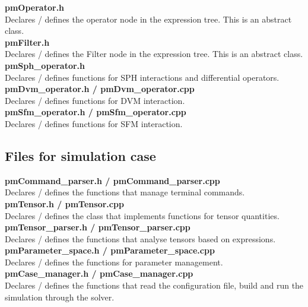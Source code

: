 \documentclass[a4paper,12pt,openany]{book}
\theoremstyle{break}
\begin{document}
\textbf{pmOperator.h} \\
Declares / defines the operator node in the expression tree. This is an abstract class. \\

\textbf{pmFilter.h} \\
Declares / defines the Filter node in the expression tree. This is an abstract class. \\

\textbf{pmSph\_operator.h} \\
Declares / defines functions for SPH interactions and differential operators. \\

\textbf{pmDvm\_operator.h / pmDvm\_operator.cpp} \\
Declares / defines functions for DVM interaction. \\

\textbf{pmSfm\_operator.h / pmSfm\_operator.cpp} \\
Declares / defines functions for SFM interaction. \\

\subsection{Files for simulation case}

\textbf{pmCommand\_parser.h / pmCommand\_parser.cpp} \\
Declares / defines the functions that manage terminal commands. \\

\textbf{pmTensor.h / pmTensor.cpp} \\
Declares / defines the class that implements functions for tensor quantities. \\

\textbf{pmTensor\_parser.h / pmTensor\_parser.cpp} \\
Declares / defines the functions that analyse tensors based on expressions. \\

\textbf{pmParameter\_space.h / pmParameter\_space.cpp} \\
Declares / defines the functions for parameter management. \\

\textbf{pmCase\_manager.h / pmCase\_manager.cpp} \\
Declares / defines the functions that read the configuration file, build and run the simulation through the solver. \\
\end{document}
